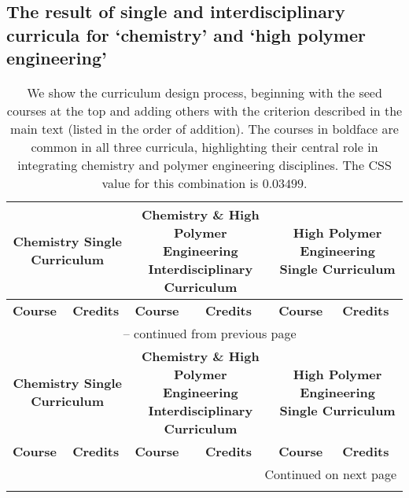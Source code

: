 \documentclass{bmcart}
\begin{document}
\begin{landscape}
\newpage
\section{The result of single and interdisciplinary curricula for `chemistry' and `high polymer engineering'}
\tiny
\label{table:chemistry_high_polymer_combination}

\setlength{\tabcolsep}{5pt} %
\renewcommand{\arraystretch}{1.2} %

\begin{longtable}{p{3.5cm}|p{1cm}|p{7cm}|p{1cm}|p{7cm}|p{1cm}}
\caption{We show the curriculum design process, beginning with the seed courses at the top and adding others with the criterion described in the main text (listed in the order of addition). The courses in boldface are common in all three curricula, highlighting their central role in integrating chemistry and polymer engineering disciplines. The CSS value for this combination is $0.03499$.} \\
\hline\hline
\multicolumn{2}{c|}{\textbf{Chemistry Single Curriculum}} & \multicolumn{2}{c|}{\textbf{Chemistry \& High Polymer Engineering Interdisciplinary Curriculum}} & \multicolumn{2}{c}{\textbf{High Polymer Engineering Single Curriculum}} \\
\hline
\scriptsize \textbf{Course} & \scriptsize \textbf{Credits} & \scriptsize \textbf{Course} & \scriptsize \textbf{Credits} & \scriptsize \textbf{Course} & \scriptsize \textbf{Credits} \\
\hline
\endfirsthead

\multicolumn{6}{c}{{\tablename\ \thetable{} -- continued from previous page}} \\
\hline
\multicolumn{2}{c|}{\textbf{Chemistry Single Curriculum}} & \multicolumn{2}{c|}{\textbf{Chemistry \& High Polymer Engineering Interdisciplinary Curriculum}} & \multicolumn{2}{c}{\textbf{High Polymer Engineering Single Curriculum}} \\
\hline
\scriptsize \textbf{Course} & \scriptsize \textbf{Credits} & \scriptsize \textbf{Course} & \scriptsize \textbf{Credits} & \scriptsize \textbf{Course} & \scriptsize \textbf{Credits} \\
\hline
\endhead

\hline \multicolumn{6}{|r|}{{Continued on next page}} \\ \hline
\endfoot

\hline\hline
\endlastfoot


\end{longtable}
\end{landscape}
\end{document}
